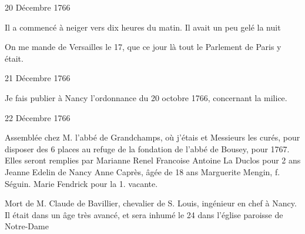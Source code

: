                      \begin{diary}{20 Décembre 1766}{}

                         Il a commencé à neiger vers dix heures
                           du matin. Il avait un peu gelé la nuit \bigskip


                         On me mande de Versailles
                           le 17, que ce jour là
                           tout le Parlement de Paris
                           y était. \bigskip


                     \end{diary}


                     \begin{diary}{21 Décembre 1766}{}

                         Je fais publier à Nancy l’ordonnance du 20
                              octobre 1766, concernant la milice. \bigskip


                     \end{diary}

                     \begin{diary}{22 Décembre 1766}{}

                         Assemblée chez
                           M. l’abbé de Grandchamps,
                           où j’étais et Messieurs les curés, pour disposer
                           des 6 places au refuge de la fondation
                              de l’abbé de Bousey, pour 1767.
                           Elles seront remplies par
                           Marianne Renel
                           Francoise Antoine
                           La Duclos pour 2 ans
                           Jeanne Edelin de Nancy
                           Anne Caprès, âgée de 18 ans
                           Marguerite Mengin,
                              f. Séguin.
                           Marie Fendrick pour la
                              1. vacante. \bigskip


                         Mort de M. Claude de Bavillier, chevalier de S. Louis,
                           ingénieur en chef à Nancy. Il
                           était dans un
                           âge très avancé, et sera inhumé le 24
                           dans
                           l’église paroisse de Notre-Dame
                        \bigskip


                     \end{diary}

